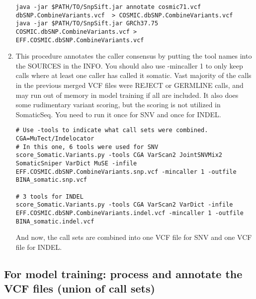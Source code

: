 \documentclass[10pt,letterpaper]{article}
\begin{document}
\begin{sloppypar}
\begin{enumerate}
\begin{lstlisting}
java -jar $PATH/TO/SnpSift.jar annotate cosmic71.vcf dbSNP.CombineVariants.vcf  > COSMIC.dbSNP.CombineVariants.vcf
java -jar $PATH/TO/SnpSift.jar GRCh37.75 COSMIC.dbSNP.CombineVariants.vcf > EFF.COSMIC.dbSNP.CombineVariants.vcf
\end{lstlisting}
	
	
\item
This procedure annotates the caller consensus by putting the tool names into the SOURCES in the INFO. You should also use -mincaller 1 to only keep calls where at least one caller has called it somatic. Vast majority of the calls in the previous merged VCF files were REJECT or GERMLINE calls, and may run out of memory in model training if all are included. It also does some rudimentary variant scoring, but the scoring is not utilized in SomaticSeq. You need to run it once for SNV and once for INDEL. 
	
\begin{lstlisting}
# Use -tools to indicate what call sets were combined. CGA=MuTect/Indelocator
# In this one, 6 tools were used for SNV
score_Somatic.Variants.py -tools CGA VarScan2 JointSNVMix2 SomaticSniper VarDict MuSE -infile EFF.COSMIC.dbSNP.CombineVariants.snp.vcf -mincaller 1 -outfile BINA_somatic.snp.vcf
	
# 3 tools for INDEL
score_Somatic.Variants.py -tools CGA VarScan2 VarDict -infile EFF.COSMIC.dbSNP.CombineVariants.indel.vcf -mincaller 1 -outfile BINA_somatic.indel.vcf
\end{lstlisting}
	
And now, the call sets are combined into one VCF file for SNV and one VCF file for INDEL.


\end{enumerate}





\subsection{For model training: process and annotate the VCF files (union of call sets)}


\end{sloppypar}
\end{document}
